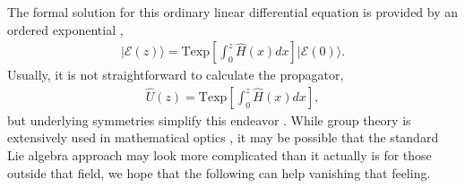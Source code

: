 \documentclass[9pt,twocolumn,twoside]{osajnl}
\begin{document}
The formal solution for this ordinary linear differential equation is provided by an ordered exponential \cite{Magnus1954p649,Blanes2009p151}, 
\begin{eqnarray}
\vert \mathcal{E}(z) \rangle = \mathrm{Texp} \left[ \int_{0}^{z} \hat{H}(x) dx \right] \vert \mathcal{E}(0) \rangle.
\end{eqnarray}
Usually, it is not straightforward to calculate the propagator,
\begin{eqnarray} 
\hat{U}(z) = \mathrm{Texp} \left[ \int_{0}^{z} \hat{H}(x) dx \right],
\end{eqnarray}
but underlying symmetries simplify this endeavor \cite{Lie1880p441,Neumaier2008}.
While group theory is extensively used in mathematical optics \cite{Wolf2004,Lakshminarayanan2012}, it may be possible that the standard Lie algebra approach may look more complicated than it actually is for those outside that field, we hope that the following can help vanishing that feeling.



\end{document}
